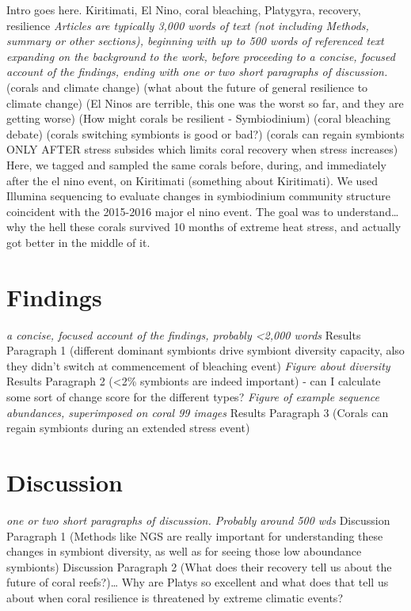 \documentclass[]{article}
\begin{document}
Intro goes here. Kiritimati, El Nino, coral bleaching, Platygyra,
recovery, resilience \emph{Articles are typically 3,000 words of text
(not including Methods, summary or other sections), beginning with up to
500 words of referenced text expanding on the background to the work,
before proceeding to a concise, focused account of the findings, ending
with one or two short paragraphs of discussion.} (corals and climate
change) (what about the future of general resilience to climate change)
(El Ninos are terrible, this one was the worst so far, and they are
getting worse) (How might corals be resilient - Symbiodinium) (coral
bleaching debate) (corals switching symbionts is good or bad?) (corals
can regain symbionts ONLY AFTER stress subsides which limits coral
recovery when stress increases) Here, we tagged and sampled the same
corals before, during, and immediately after the el nino event, on
Kiritimati (something about Kiritimati). We used Illumina sequencing to
evaluate changes in symbiodinium community structure coincident with the
2015-2016 major el nino event. The goal was to understand\ldots{}why the
hell these corals survived 10 months of extreme heat stress, and
actually got better in the middle of it.

\section{Findings}\label{findings}

\emph{a concise, focused account of the findings, probably
\textless{}2,000 words} Results Paragraph 1 (different dominant
symbionts drive symbiont diversity capacity, also they didn't switch at
commencement of bleaching event) \emph{Figure about diversity} Results
Paragraph 2 (\textless{}2\% symbionts are indeed important) - can I
calculate some sort of change score for the different types?
\emph{Figure of example sequence abundances, superimposed on coral 99
images} Results Paragraph 3 (Corals can regain symbionts during an
extended stress event)

\section{Discussion}\label{discussion}

\emph{one or two short paragraphs of discussion. Probably around 500
wds} Discussion Paragraph 1 (Methods like NGS are really important for
understanding these changes in symbiont diversity, as well as for seeing
those low aboundance symbionts) Discussion Paragraph 2 (What does their
recovery tell us about the future of coral reefs?)\ldots{} Why are
Platys so excellent and what does that tell us about when coral
resilience is threatened by extreme climatic events?
\end{document}
